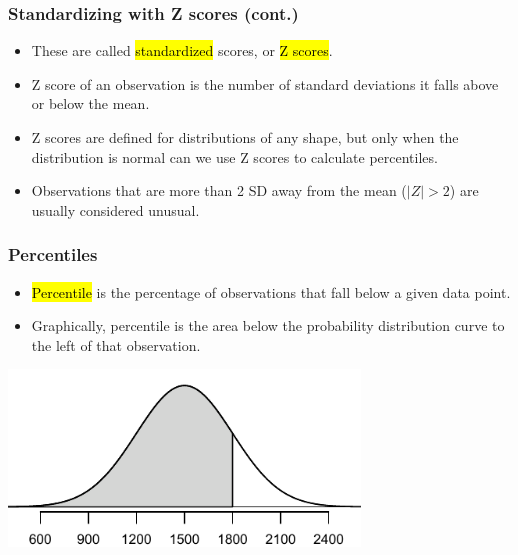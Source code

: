 
\begin{frame}
\frametitle{Standardizing with Z scores (cont.)}

\begin{itemize}

\item These are called \hl{standardized} scores, or \hl{Z scores}.

\item Z score of an observation is the number of standard deviations it falls above or below the mean.
\formula{\[Z = \frac{observation - mean}{SD}\]}

\item Z scores are defined for distributions of any shape, but only when the distribution is normal can we use Z scores to calculate percentiles.

\item Observations that are more than 2 SD away from the mean ($|Z| > 2$) are usually considered unusual.

\end{itemize}

\end{frame}


\begin{frame}
\frametitle{Percentiles}

\begin{itemize}

\item \hl{Percentile} is the percentage of observations that fall below a given data point. 

\item Graphically, percentile is the area below the probability distribution curve to the left of that observation.

\end{itemize}

\begin{center}
\includegraphics[width=0.7\textwidth]{3-1_normal_distribution/figures/satBelow1800/satBelow1800}
\end{center}

\end{frame}

